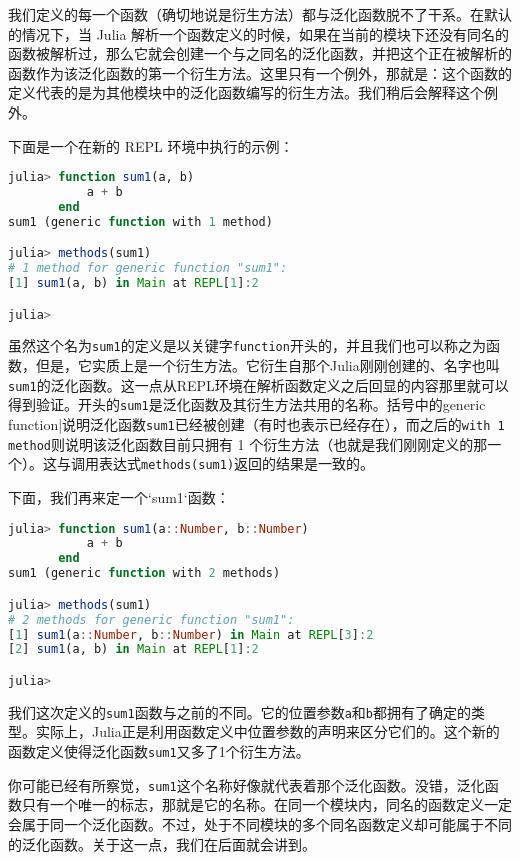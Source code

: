我们定义的每一个函数（确切地说是衍生方法）都与泛化函数脱不了干系。在默认的情况下，当 Julia 解析一个函数定义的时候，如果在当前的模块下还没有同名的函数被解析过，那么它就会创建一个与之同名的泛化函数，并把这个正在被解析的函数作为该泛化函数的第一个衍生方法。这里只有一个例外，那就是：这个函数的定义代表的是为其他模块中的泛化函数编写的衍生方法。我们稍后会解释这个例外。

下面是一个在新的 REPL 环境中执行的示例：

\begin{lstlisting}[language=julia]
julia> function sum1(a, b)
           a + b
       end
sum1 (generic function with 1 method)

julia> methods(sum1)
# 1 method for generic function "sum1":
[1] sum1(a, b) in Main at REPL[1]:2

julia> 
\end{lstlisting}

虽然这个名为\verb|sum1|的定义是以关键字\verb|function|开头的，并且我们也可以称之为函数，但是，它实质上是一个衍生方法。它衍生自那个Julia刚刚创建的、名字也叫\verb|sum1|的泛化函数。这一点从REPL环境在解析函数定义之后回显的内容那里就可以得到验证。开头的\verb|sum1|是泛化函数及其衍生方法共用的名称。括号中的generic function|说明泛化函数\verb|sum1|已经被创建（有时也表示已经存在），而之后的\verb|with 1 method|则说明该泛化函数目前只拥有 1 个衍生方法（也就是我们刚刚定义的那一个）。这与调用表达式\verb|methods(sum1)|返回的结果是一致的。

下面，我们再来定一个`sum1`函数：

\begin{lstlisting}[language=julia]
julia> function sum1(a::Number, b::Number)
           a + b
       end
sum1 (generic function with 2 methods)

julia> methods(sum1)
# 2 methods for generic function "sum1":
[1] sum1(a::Number, b::Number) in Main at REPL[3]:2
[2] sum1(a, b) in Main at REPL[1]:2

julia> 
\end{lstlisting}

我们这次定义的\verb|sum1|函数与之前的不同。它的位置参数\verb|a|和\verb|b|都拥有了确定的类型。实际上，Julia正是利用函数定义中位置参数的声明来区分它们的。这个新的函数定义使得泛化函数\verb|sum1|又多了1个衍生方法。

你可能已经有所察觉，\verb|sum1|这个名称好像就代表着那个泛化函数。没错，泛化函数只有一个唯一的标志，那就是它的名称。在同一个模块内，同名的函数定义一定会属于同一个泛化函数。不过，处于不同模块的多个同名函数定义却可能属于不同的泛化函数。关于这一点，我们在后面就会讲到。

